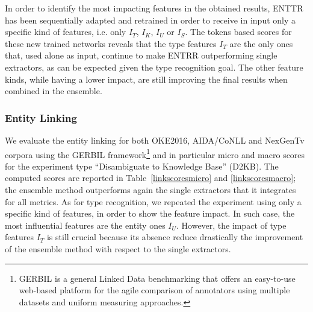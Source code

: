 \documentclass{llncs}
\newcommand{\tabref}[1]{\mbox{Table~\ref{#1}}}
\begin{document}
In order to identify the most impacting features in the obtained results, ENTTR has been sequentially adapted and retrained in order to receive in input only a specific kind of features, i.e. only $I_T$, $I_K$, $I_U$ or $I_S$. The tokens based scores for these new trained networks reveals that the type features \textit{$I_T$} are the only ones that, used alone as input, continue to make ENTRR outperforming single extractors, as can be expected given the type recognition goal. The other feature kinds, while having a lower impact, are still improving the final results when combined in the ensemble.

\subsubsection{Entity Linking}

We evaluate the entity linking for both OKE2016, AIDA/CoNLL and NexGenTv corpora  using the GERBIL framework\footnote{GERBIL is a general Linked Data benchmarking that offers an easy-to-use web-based platform for the agile comparison of annotators using multiple datasets and uniform measuring approaches.} and in particular micro and macro scores for the experiment type ``Disambiguate to Knowledge Base'' (D2KB). The computed scores are reported in \tabref{linkscoresmicro} and \ref{linkscoresmacro}; the ensemble method outperforms again the single extractors that it integrates for all metrics. As for type recognition, we repeated the experiment using only a specific kind of features, in order to show the feature impact. In such case, the most influential features are the entity ones \textit{$I_U$}. However, the impact of type features \textit{$I_T$} is still crucial because its absence reduce drastically the improvement of the ensemble method with respect to the single extractors.
\end{document}
